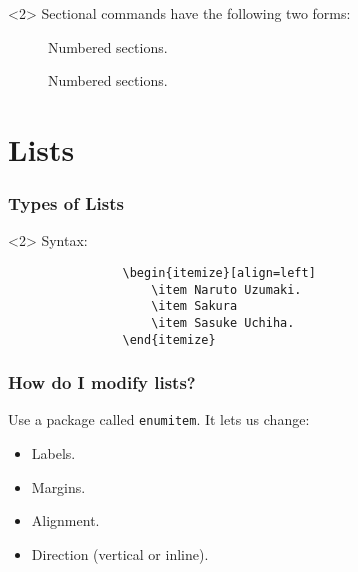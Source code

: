 \documentclass{beamer}
\begin{document}
\begin{frame}[fragile]
		\begin{onlyenv}<2>
			Sectional commands have the following two forms:
			\begin{description}
				\item[\texttt{\section{}}] Numbered sections.
				\item[\texttt{\section*{}}] Numbered sections.
			\end{description}
		\end{onlyenv}
	\end{frame}

	\section{Lists}
	\begin{frame}[fragile]
		\frametitle{Types of Lists}
		\begin{onlyenv}<2>
			Syntax:
			\begin{verbatim}
				\begin{itemize}[align=left]
					\item Naruto Uzumaki.
					\item Sakura
					\item Sasuke Uchiha.
				\end{itemize}
			\end{verbatim}
		\end{onlyenv}
	\end{frame}

	\begin{frame}[t]
		\frametitle{How do I modify lists?}
			\vfill
			Use a package called \texttt{enumitem}.
			\vfill
			It lets us change:
			\begin{itemize}
				\item Labels.
				\item Margins.
				\item Alignment.
				\item Direction (vertical or inline).
			\end{itemize}
			\vfill
	\end{frame}
	
\end{document}
